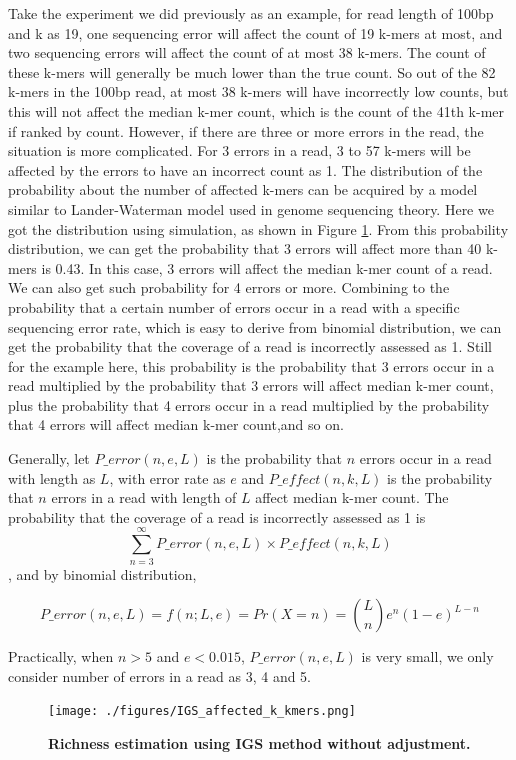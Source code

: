 Take the experiment we did
previously as an example, for read length of 100bp and k as 19, one sequencing
error will affect the count of 19 k-mers at most, and two sequencing errors
will affect the count of at most 38 k-mers. The count of these k-mers will
generally be much lower than the true count. So out of the 82 k-mers
in the 100bp read, at most 38 k-mers will have incorrectly low counts, but this
will not affect the median k-mer count, which is the count of the 41th k-mer if
ranked by count. However, if there are three or more errors in the read, the 
situation is more complicated. For 3 errors in a read, 3 to 57 k-mers
will be affected by the errors to have an incorrect count as 1. The 
distribution of the probability about the number of affected k-mers can be
acquired by a model similar to Lander-Waterman model used in genome sequencing
 theory. Here we got the distribution using simulation, as shown in Figure
\ref{fig:IGS_affected_k_kmers}. From this probability distribution, we can get
the probability that 3 errors will affect more than 40 k-mers is 0.43. In this
case, 3 errors will affect the median k-mer count of a read. We can also get 
such probability for 4 errors or more. Combining to the probability that a
certain number of errors occur in a read with a specific sequencing error rate,
which is easy to derive from binomial distribution, we can get the probability
that the coverage of a read is incorrectly assessed as 1. Still for the example
here, this probability is the probability that 3 errors occur in a read
multiplied by the probability that 3 errors will affect median k-mer count,
plus the probability that 4 errors occur in a read multiplied by the 
probability that 4 errors will affect median k-mer count,and so on.

Generally, let $P\_error(n,e,L)$ is the probability that $n$ errors occur in a 
read with length as $L$, with error rate as $e$ and $P\_effect(n,k,L)$ is the 
probability that $n$ 
errors in a read with length of $L$ affect median k-mer count. The probability 
that the coverage of a read is incorrectly assessed as 1 is 
\[\sum_{n=3}^{\infty} P\_error(n,e,L) \times P\_effect(n,k,L)  \],
and by binomial distribution,

\[P\_error(n,e,L) = f(n;L,e) = Pr(X=n) = {L \choose n}e^n(1-e)^{L-n} \] 

Practically, when $n>5$ and $e<0.015$, $P\_error(n,e,L)$ is very small, we only consider
number of errors in a read as 3, 4 and 5.

\begin{figure}[!ht]
 \centerline{\texttt{[image: ./figures/IGS\_affected\_k\_kmers.png]}}
\caption{\bf Richness estimation using IGS method without adjustment. }
\label{fig:IGS_affected_k_kmers}
\end{figure}

